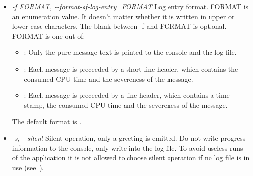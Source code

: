\begin{itemize}
\begin{itemize}
        Additionally, if a concise log format is chosen (see )
        which doesn't have time stamps, then  will also print
        some timing information.

      \item {}: The warnings are printed. Computation results can
        be found only exported as Octave code (see~).

      \item {} The error messages are printed. Computation
        results can be found only exported as Octave code (see~).

      \item {}: Only the fatal error messages are printed. Fatal
        errors (as opposed to the ``normal'' errors) are those, which lead
        to immediate (but still controlled) program termination; the
        out-of-memory error is a prominent example. Computation results --
        if any -- can be found only exported as Octave code
        (see~).
    \end{itemize}
    Each verbosity level includes all output of the less verbose levels.
    The default level is .

  \item \emph{-f FORMAT, -{}-format-of-log-entry=FORMAT}
    Log entry format. FORMAT is an enumeration value. It doesn't matter
    whether it is written in upper or lower case characters. The blank
    between -f and FORMAT is optional. FORMAT is one out of:
    \begin{itemize}
      \item {}: Only the pure message text is printed to the
        console and the log file.

      \item {}: Each message is preceeded by a short line
        header, which contains the consumed CPU time and the severeness of
        the message.

      \item {}: Each message is preceeded by a line header, which
        contains a time stamp, the consumed CPU time and the severeness of
        the message.
    \end{itemize}
    The default format is .

  \item \emph{-s, -{}-silent}
    Silent operation, only a greeting is emitted. Do not write progress
    information to the console, only write into the log file. To avoid
    useless runs of the application it is not allowed to choose silent
    operation if no log file is in use (see~).


\end{itemize}
